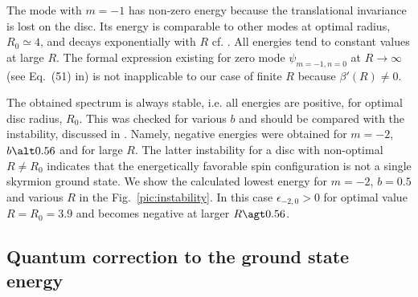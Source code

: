 \documentclass[aps,prb,twocolumn,superscriptaddress,nobalancelastpage]{revtex4-1}
\begin{document}
The mode with $m=-1$ has  non-zero energy because the translational invariance is lost on the disc. Its energy is comparable to other modes at optimal radius, $R_{0} \simeq 4$, and decays exponentially with $R$ cf.  \cite{Schutte2014}. All energies tend to constant values at large $R$. 
The formal expression existing  for zero mode $\psi_{m=-1,n=0}$  at $R\to \infty$ (see Eq.\ (51) in\cite{Schutte2014})  is not inapplicable to our case   of finite $R$   because $\beta'(R) \neq 0$.

The obtained spectrum is always stable, i.e. all energies are positive, for optimal disc radius, $R_{0}$. This was checked for various $b$ and should be compared with the instability, discussed  in \cite{Schutte2014}. Namely,  negative energies were obtained for $m=-2$,  $b\alt 0.56$ and for large $R$.  The latter instability for a disc with non-optimal $R\neq R_{0}$ indicates that the energetically favorable spin configuration is not a single skyrmion ground state. \cite{Schutte2014,Ezawa2011} We show the calculated lowest energy for $m=-2$, $b=0.5$ and various $R$ in the Fig.\ \ref{pic:instability}. In this case $\epsilon _{-2,0} >0$ for optimal value $R=R_{0}=3.9$ and becomes negative at larger $R\agt 0.56$.



\subsection{Quantum correction to the ground state energy
\label{sec:corrections}}
\end{document}
